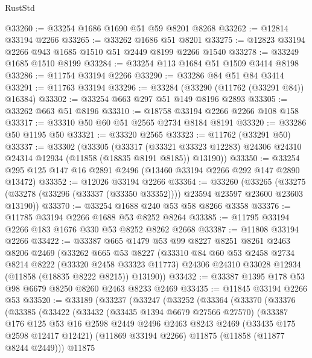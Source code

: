 \begin{lexlean}{RustStd}
\begin{coremodule}
@33260 := @33254 @1686 @1690 @51 @59 @8201 @8268
@33262 := @12814 @33194 @2266
@33265 := @33262 @1686 @51 @8201
@33275 := @12823 @33194 @2266 @943 @1685 @1510 @51 @2449 @8199 @2266 @1540
@33278 := @33249 @1685 @1510 @8199
@33284 := @33254 @113 @1684 @51 @1509 @3414 @8198
@33286 := @11754 @33194 @2266
@33290 := @33286 @84 @51 @84 @3414
@33291 := @11763 @33194
@33296 := @33284 (@33290 (@11762 (@33291 @84)) @16384)
@33302 := @33254 @663 @297 @51 @149 @8196 @2893
@33305 := @33262 @663 @51 @8196
@33310 := @18758 @33194 @2266 @2266 @108 @158
@33317 := @33310 @50 @60 @51 @2565 @2734 @8184 @8191
@33320 := @33286 @50 @1195 @50
@33321 := @33320 @2565
@33323 := @11762 (@33291 @50)
@33337 := @33302
    (@33305
      (@33317
        (@33321 @33323 @12283)
        @24306
        @24310
        @24314
        @12934
        (@11858 (@18835 @8191 @8185))
        @13190))
@33350 := @33254 @295 @125 @147 @16 @2891 @2496 (@13460 @33194 @2266 @292 @147 @2890 @13472)
@33352 := @12026 @33194 @2266
@33364 := @33260
    (@33265 (@33275 (@33278 (@33296 (@33337 (@33350 @33352)))) @23594 @23597 @23600 @23603 @13190))
@33370 := @33254 @1688 @240 @53 @58 @8266 @3358
@33376 := @11785 @33194 @2266 @1688 @53 @8252 @8264
@33385 := @11795 @33194 @2266 @183 @1676 @330 @53 @8252 @8262 @2668
@33387 := @11808 @33194 @2266
@33422 := @33387
    @665
    @1479
    @53
    @99
    @8227
    @8251
    @8261
    @2463
    @8206
    @2469
    (@33262
      @665
      @53
      @8227
      (@33310
        @84
        @60
        @53
        @2458
        @2734
        @8214
        @8222
        (@33320 @2458 @33323 @11773)
        @24306
        @24310
        @33028
        @12934
        (@11858 (@18835 @8222 @8215))
        @13190))
@33432 := @33387 @1395 @178 @53 @98 @6679 @8250 @8260 @2463 @8233 @2469
@33435 := @11845 @33194 @2266 @53
@33520 := @33189
    (@33237
      (@33247
        (@33252
          (@33364
            (@33370
              (@33376
                (@33385
                  (@33422
                    (@33432
                      (@33435 @1394 @6679 @27566 @27570)
                      (@33387
                        @176
                        @125
                        @53
                        @16
                        @2598
                        @2449
                        @2496
                        @2463
                        @8243
                        @2469
                        (@33435 @175 @2598 @12417 @12421)
                        (@11869 @33194 @2266)
                        @11875
                        (@11858 (@11877 @8244 @2449)))
                      @11875

\end{coremodule}
\end{lexlean}
